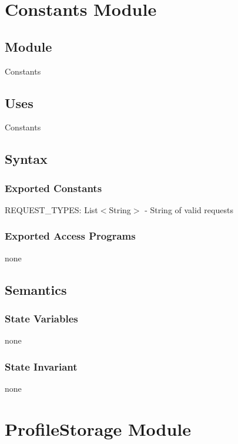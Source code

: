 \documentclass[12pt, titlepage]{article}
\newcommand{\newConstantsModule}[6]{
	\subsection* {Module}
		#1
	\subsection* {Uses}
		#2
	\subsection* {Syntax}
		\subsubsection* {Exported Constants}
			#3
		\subsubsection* {Exported Access Programs}
			#4
	\subsection* {Semantics}
		\subsubsection* {State Variables}
			#5
		\subsubsection* {State Invariant}
			#6
}
\begin{document}
\newpage


\section {Constants Module}

\label{Constants}
\newConstantsModule{Constants}
	{%
		Constants
	}
	{%
		REQUEST\_TYPES: List$<$String$>$ - String of valid requests
	}
	{%
	none
	}
	{%
		none\\
	}
	{%
        none
	}
% 		
	
\newpage

\section {ProfileStorage Module}
\end{document}

